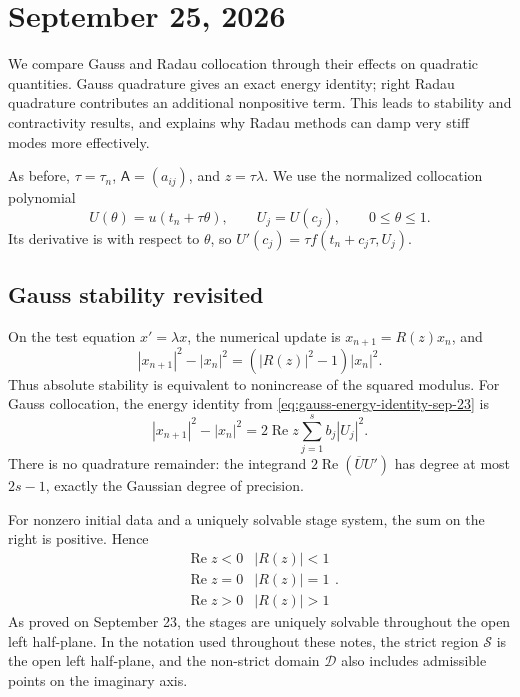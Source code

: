 \section{September 25, 2026}

We compare Gauss and Radau collocation through their effects on
quadratic quantities. Gauss quadrature gives an exact energy identity;
right Radau quadrature contributes an additional nonpositive term.
This leads to stability and contractivity results, and explains why
Radau methods can damp very stiff modes more effectively.

As before, \(\tau=\tau_n\), \(\mathsf A=(a_{ij})\), and
\(z=\tau\lambda\). We use the normalized collocation polynomial
\[
 U(\theta)=u(t_n+\tau\theta),\qquad U_j=U(c_j),
 \qquad 0\leq\theta\leq1.
\]
Its derivative is with respect to \(\theta\), so
\(U'(c_j)=\tau f(t_n+c_j\tau,U_j)\).

\subsection{Gauss stability revisited}

On the test equation \(x'=\lambda x\), the numerical update is
\(x_{n+1}=R(z)x_n\), and
\[
 |x_{n+1}|^2-|x_n|^2=(|R(z)|^2-1)|x_n|^2.
\]
Thus absolute stability is equivalent to nonincrease of the squared
modulus. For Gauss collocation, the energy identity from
\eqref{eq:gauss-energy-identity-sep-23} is
\begin{equation}\label{eq:gauss-energy-sep-25}
 |x_{n+1}|^2-|x_n|^2
  =2\operatorname{Re}z\sum_{j=1}^s b_j|U_j|^2.
\end{equation}
There is no quadrature remainder: the integrand
\(2\operatorname{Re}(\overline U U')\) has degree at most
\(2s-1\), exactly the Gaussian degree of precision.

For nonzero initial data and a uniquely solvable stage system, the
sum on the right is positive. Hence
\[
 \begin{array}{c|c}
  \operatorname{Re}z<0&|R(z)|<1\\
  \operatorname{Re}z=0&|R(z)|=1\\
  \operatorname{Re}z>0&|R(z)|>1
 \end{array}.
\]
As proved on September 23, the stages are uniquely solvable throughout
the open left half-plane. In the notation used throughout these notes,
the strict region \(\mathcal S\) is the open left half-plane, and
the non-strict domain \(\mathcal D\) also includes admissible points
on the imaginary axis.

